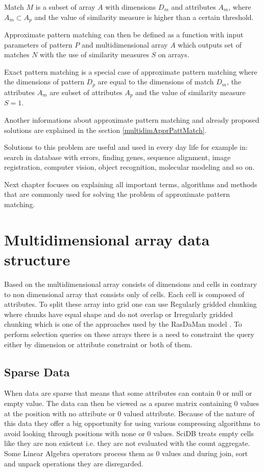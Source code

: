 Match $M$ is a subset of array $A$ with dimensions $D_m$ and attributes $A_m$, where $A_m \subset A_p$ and the value of similarity measure is higher than a certain threshold.

Approximate pattern matching can then be defined as a function with input parameters of pattern $P$ and multidimensional array $A$ which outputs set of matches $N$ with the use of similarity measures $S$ on arrays.

Exact pattern matching is a special case of approximate pattern matching where the dimensions of pattern $D_p$ are equal to the dimensions of match $D_m$, the attributes $A_m$ are subset of attributes $A_p$ and the value of similarity measure $S = 1$.

Another informations about approximate pattern matching and already proposed solutions are explained in the section \ref{multidimApprPattMatch}.

Solutions to this problem are useful and used in every day life for example in: search in database with errors, finding genes, sequence alignment, image registration, computer vision, object recognition, molecular modeling and so on. 

Next chapter focuses on explaining all important terms, algorithms and methods that are commonly used for solving the problem of approximate pattern matching.


\section{Multidimensional array data structure}\label{multidimArrayDataStructure}
Based on \cite{samet} the multidimensional array consists of dimensions and cells in contrary to non dimensional array that consists only of cells. Each cell is composed of attributes. To split these array into grid one can use Regularly gridded chunking where chunks have equal shape and do not overlap or Irregularly gridded chunking which is one of the approaches used by the RasDaMan model \cite{rasdaman}.
To perform selection queries on these arrays there is a need to constraint the query either by dimension or attribute constraint or both of them.

\subsection{Sparse Data}
When data are sparse that means that some attributes can contain 0 or null or empty value. The data can then be viewed as a sparse matrix containing 0 values at the position with no attribute or 0 valued attribute. Because of the nature of this data they offer a big opportunity for using various compressing algorithms to avoid looking through positions with none or 0 values. SciDB \cite{scidb} treats empty cells like they are non existent i.e. they are not evaluated with the count aggregate. Some Linear Algebra operators process them as 0 values and during join, sort and unpack operations they are disregarded.

